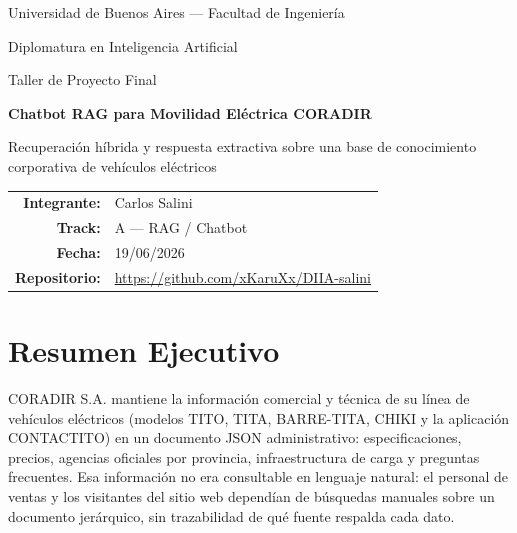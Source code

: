 \documentclass[11pt,a4paper]{article}
\title{}
\date{}
\begin{document}
\begin{titlepage}
    \centering
    \vspace*{2cm}
    {\Large Universidad de Buenos Aires --- Facultad de Ingeniería\par}
    \vspace{0.3cm}
    {\large Diplomatura en Inteligencia Artificial\par}
    {\large Taller de Proyecto Final\par}
    \vspace{2.5cm}
    {\Huge\bfseries Chatbot RAG para Movilidad Eléctrica CORADIR\par}
    \vspace{0.6cm}
    {\Large Recuperación híbrida y respuesta extractiva sobre una base de
    conocimiento corporativa de vehículos eléctricos\par}
    \vspace{2.5cm}
    \begin{tabular}{rl}
        \textbf{Integrante:} & Carlos Salini \\[0.2cm]
        \textbf{Track:} & A --- RAG / Chatbot \\[0.2cm]
        \textbf{Fecha:} & 19/06/2026 \\[0.2cm]
        \textbf{Repositorio:} & \url{https://github.com/xKaruXx/DIIA-salini} \\
    \end{tabular}
    \vfill
\end{titlepage}

\tableofcontents
\newpage

\section{Resumen Ejecutivo}

CORADIR S.A. mantiene la información comercial y técnica de su línea de
vehículos eléctricos (modelos TITO, TITA, BARRE-TITA, CHIKI y la aplicación
CONTACTITO) en un documento JSON administrativo: especificaciones, precios,
agencias oficiales por provincia, infraestructura de carga y preguntas
frecuentes. Esa información no era consultable en lenguaje natural: el
personal de ventas y los visitantes del sitio web dependían de búsquedas
manuales sobre un documento jerárquico, sin trazabilidad de qué fuente
respalda cada dato.
\end{document}
